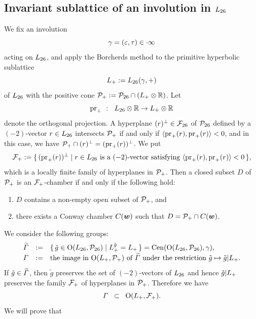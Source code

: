 \documentclass{amsart} %
\begin{document}
\subsection{Invariant sublattice of an involution in $L_{26}$}\label{subsec:sublatLts}
%
We fix an involution
%
\begin{equation*}\label{eq:gamma}
\gamma=(\varepsilon, \tau)\in \cdot \infty
\end{equation*}
%
 acting on $L_{26}$, and 
 apply the Borcherds method to the primitive hyperbolic sublattice
\[
L_{+}:=L_{26}(\gamma, +)
\]
of $L_{26}$ 
with the positive cone $\mathord{\mathcal{P}}_{+}:=\mathord{\mathcal{P}}_{26}\cap(L_{+}\otimes \mathord{\mathbb{R}})$.
Let
\[
\operatorname{pr}_{+}\;\;\colon\;\; L_{26}\otimes \mathord{\mathbb{R}} \to L_{+}\otimes \mathord{\mathbb{R}}
\]
denote the orthogonal projection.
A hyperplane $(r)^{\perp}\in {\mathord{\mathcal{F}}}_{26}$ of $\mathord{\mathcal{P}}_{26}$
defined by a $(-2)$-vector $r\in L_{26}$
intersects $\mathord{\mathcal{P}}_{+}$
if and only if
$\langle \operatorname{pr}_{+}(r), \operatorname{pr}_{+}(r) \rangle<0$,
and in this case,
we have $ \mathord{\mathcal{P}}_{+}\cap (r)^{\perp}=(\operatorname{pr}_{+}(r))^{\perp}$.
We put
\[
\mathord{\mathcal{F}}_{+}:=\{\,{(\operatorname{pr}_{+}(r))^{\perp}}\mid {\textrm{$r\in L_{26}$ is a $(-2)$-vector satisfying 
$\langle \operatorname{pr}_{+}(r), \operatorname{pr}_{+}(r) \rangle<0$}} \,\},
\]
which is a  locally finite family  of hyperplanes in $\mathord{\mathcal{P}}_{+}$.
Then a closed subset $D$ of $\mathord{\mathcal{P}}_{+}$ is 
an $\mathord{\mathcal{F}}_{+}$-chamber if and only if the following hold:
%
\begin{enumerate}[label=(\alph*)]
\item 
$D$ contains a non-empty open subset of $\mathord{\mathcal{P}}_{+}$, and 
\item there exists a Conway chamber $\mathord{C}(\boldsymbol{w})$
such that $D=\mathord{\mathcal{P}}_{+}\cap \mathord{C}(\boldsymbol{w})$.
\end{enumerate}
%
We consider the following groups: 
%
\begin{equation}\label{eq:vGamdef}
\renewcommand{\arraystretch}{1.2}
\begin{array}{ccl}
\tilvGam &:=& \set{\tilde{g}\in \OG(\Lts, \PPPts)}{\Lplus^{\tilde{g}}=\Lplus}=\Cen(\OG(\Lts, \PPPts), \gamma), \\
\vGam &:=& \textrm{the image in $\OG(\Lplus, \PPPplus)$ of $\tilvGam$ under  the restriction %
$\tilde{g}\mapsto \tilde{g}|\Lplus$}.
\end{array}
\end{equation}
%
If $\tilde{g}\in \widetilde{\varGamma}$,
then $\tilde{g}$ preserves the set of $(-2)$-vectors of $L_{26}$ and hence $\tilde{g}|L_{+}$
preserves the family $\mathord{\mathcal{F}}_{+}$ of hyperplanes in $\mathord{\mathcal{P}}_{+}$.
Therefore we have
\[
\varGamma\;\;\subset \;\; \mathord{\mathrm{O}}(L_{+}, \mathord{\mathcal{F}}_{+}).
\]
We will prove that 
\end{document}

